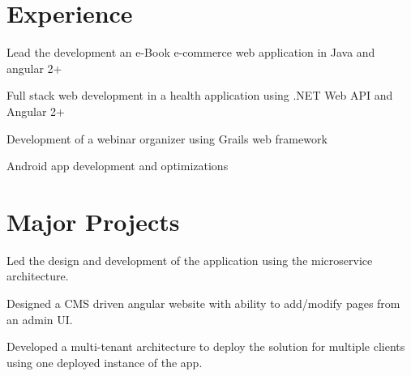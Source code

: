 \documentclass[]{deedy-resume-openfont}
\begin{document}
\begin{minipage}[t]{0.66\textwidth} 


\section{Experience}

\vspace{\topsep} %
\begin{tightemize}
    \item Lead the development an e-Book e-commerce web application in Java and angular 2+
    \item Full stack web development in a health application using .NET Web API and Angular 2+
    \item Development of a webinar organizer using Grails web framework 
    \item Android app development and optimizations
    
\end{tightemize}
\sectionsep


\section{Major Projects}

\begin{tightemize}
    \item Led the design and development of the application using the microservice architecture.
    \item Designed a CMS driven angular website with ability to add/modify pages from an admin UI. 
    \item Developed a multi-tenant architecture to deploy the solution for multiple clients using one deployed instance of the app.
\end{tightemize}
\sectionsep


\end{minipage}
\end{document}
